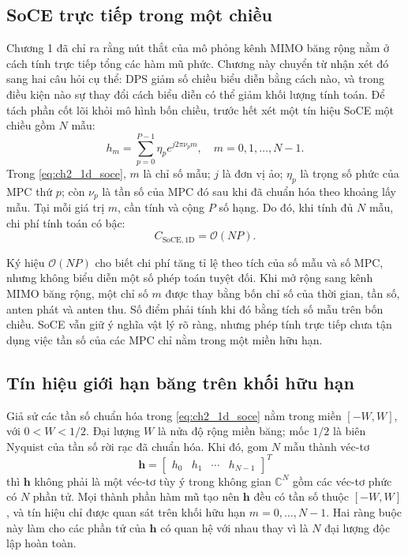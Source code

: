 \setcounter{section}{2}
\label{chap:dps_advantage}

\subsection{SoCE trực tiếp trong một chiều}
\label{subsec:ch2_1d_soce}

Chương 1 đã chỉ ra rằng nút thắt của mô phỏng kênh MIMO băng rộng nằm ở cách tính trực tiếp tổng các hàm mũ phức. Chương này chuyển từ nhận xét đó sang hai câu hỏi cụ thể: DPS giảm số chiều biểu diễn bằng cách nào, và trong điều kiện nào sự thay đổi cách biểu diễn có thể giảm khối lượng tính toán. Để tách phần cốt lõi khỏi mô hình bốn chiều, trước hết xét một tín hiệu SoCE một chiều gồm \(N\) mẫu:
\begin{equation}
h_m = \sum_{p=0}^{P-1}\eta_p e^{j2\pi \nu_p m},
\quad m=0,1,\ldots,N-1.
\label{eq:ch2_1d_soce}
\end{equation}
Trong \eqref{eq:ch2_1d_soce}, \(m\) là chỉ số mẫu; \(j\) là đơn vị ảo; \(\eta_p\) là trọng số phức của MPC thứ \(p\); còn \(\nu_p\) là tần số của MPC đó sau khi đã chuẩn hóa theo khoảng lấy mẫu. Tại mỗi giá trị \(m\), cần tính và cộng \(P\) số hạng. Do đó, khi tính đủ \(N\) mẫu, chi phí tính toán có bậc:
\begin{equation}
C_{\mathrm{SoCE},1\mathrm{D}}=\mathcal{O}(NP).
\label{eq:ch2_1d_soce_complexity}
\end{equation}

Ký hiệu \(\mathcal{O}(NP)\) cho biết chi phí tăng tỉ lệ theo tích của số mẫu và số MPC, nhưng không biểu diễn một số phép toán tuyệt đối. Khi mở rộng sang kênh MIMO băng rộng, một chỉ số \(m\) được thay bằng bốn chỉ số của thời gian, tần số, anten phát và anten thu. Số điểm phải tính khi đó bằng tích số mẫu trên bốn chiều. SoCE vẫn giữ ý nghĩa vật lý rõ ràng, nhưng phép tính trực tiếp chưa tận dụng việc tần số của các MPC chỉ nằm trong một miền hữu hạn.

\subsection{Tín hiệu giới hạn băng trên khối hữu hạn}
\label{subsec:ch2_bandlimited_block}

Giả sử các tần số chuẩn hóa trong \eqref{eq:ch2_1d_soce} nằm trong miền \([-W,W]\), với \(0<W<1/2\). Đại lượng \(W\) là nửa độ rộng miền băng; mốc \(1/2\) là biên Nyquist của tần số rời rạc đã chuẩn hóa. Khi đó, gom \(N\) mẫu thành véc-tơ
\begin{equation}
\mathbf{h}
= \begin{bmatrix}
h_0 & h_1 & \cdots & h_{N-1}
\end{bmatrix}^{T}
\label{eq:ch2_sample_vector}
\end{equation}
thì \(\mathbf{h}\) không phải là một véc-tơ tùy ý trong không gian \(\mathbb{C}^{N}\) gồm các véc-tơ phức có \(N\) phần tử. Mọi thành phần hàm mũ tạo nên \(\mathbf{h}\) đều có tần số thuộc \([-W,W]\), và tín hiệu chỉ được quan sát trên khối hữu hạn \(m=0,\ldots,N-1\). Hai ràng buộc này làm cho các phần tử của \(\mathbf{h}\) có quan hệ với nhau thay vì là \(N\) đại lượng độc lập hoàn toàn.

